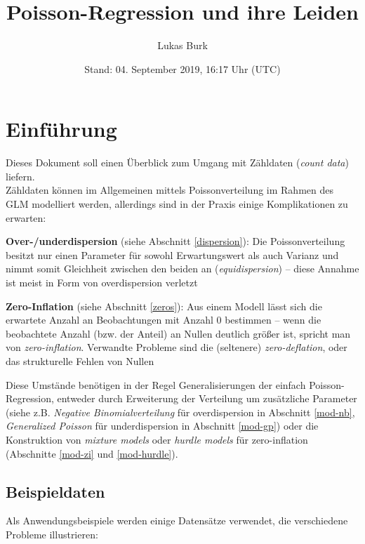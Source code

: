 \documentclass[ngerman,a4paper,]{scrartcl}
\title{Poisson-Regression und ihre Leiden}
\author{Lukas Burk}
\date{Stand: 04. September 2019, 16:17 Uhr (UTC)}
\theoremstyle{definition}
\theoremstyle{definition}
\theoremstyle{definition}
\theoremstyle{remark}
\begin{document}
\maketitle

{
\hypersetup{linkcolor=black}
\setcounter{tocdepth}{2}
\tableofcontents
}
\hypertarget{einfuhrung}{%
\section{Einführung}\label{einfuhrung}}

Dieses Dokument soll einen Überblick zum Umgang mit Zähldaten (\emph{count data}) liefern.\\
Zähldaten können im Allgemeinen mittels Poissonverteilung im Rahmen des GLM modelliert werden, allerdings sind in der Praxis einige Komplikationen zu erwarten:

\textbf{Over-/underdispersion} (siehe Abschnitt \ref{dispersion}): Die Poissonverteilung besitzt nur einen Parameter für sowohl Erwartungswert als auch Varianz und nimmt somit Gleichheit zwischen den beiden an (\emph{equidispersion}) -- diese Annahme ist meist in Form von overdispersion verletzt

\textbf{Zero-Inflation} (siehe Abschnitt \ref{zeros}): Aus einem Modell lässt sich die erwartete Anzahl an Beobachtungen mit Anzahl \(0\) bestimmen -- wenn die beobachtete Anzahl (bzw. der Anteil) an Nullen deutlich größer ist, spricht man von \emph{zero-inflation}. Verwandte Probleme sind die (seltenere) \emph{zero-deflation}, oder das strukturelle Fehlen von Nullen

Diese Umstände benötigen in der Regel Generalisierungen der einfach Poisson-Regression, entweder durch Erweiterung der Verteilung um zusätzliche Parameter (siehe z.B. \emph{Negative Binomialverteilung} für overdispersion in Abschnitt \ref{mod-nb}, \emph{Generalized Poisson} für underdispersion in Abschnitt \ref{mod-gp}) oder die Konstruktion von \emph{mixture models} oder \emph{hurdle models} für zero-inflation (Abschnitte \ref{mod-zi} und \ref{mod-hurdle}).

\hypertarget{data}{%
\subsection{Beispieldaten}\label{data}}

Als Anwendungsbeispiele werden einige Datensätze verwendet, die verschiedene Probleme illustrieren:
\end{document}
